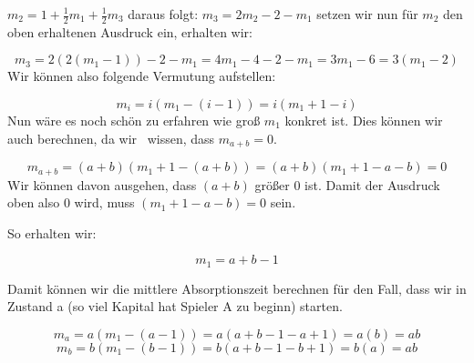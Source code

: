 \begin{uebsp}
 $m_{2}=1+\frac{1}{2}m_{1}+\frac{1}{2}m_{3}$  daraus folgt: 
$m_{3}=2m_{2}-2-m_{1}$ setzen wir nun f\"ur  $m_{2}$ den oben
erhaltenen Ausdruck ein, erhalten wir:




\bigskip

\begin{equation*}
m_{3}=2(2(m_{1}-1))-2-m_{1}=4m_{1}-4-2-m_{1}=3m_{1}-6=3(m_{1}-2)
\end{equation*}
Wir k\"onnen also folgende Vermutung aufstellen:





\begin{equation*}
m_{i}=i(m_{1}-(i-1))=i(m_{1}+1-i)
\end{equation*}
Nun w\"are es noch sch\"on zu erfahren wie gro{\ss}  $m_{1}$ konkret
ist. Dies k\"onnen wir auch berechnen, da wir \ wissen, dass
$m_{a+b}=0$.





\begin{equation*}
m_{a+b}=(a+b)(m_{1}+1-(a+b))=(a+b)(m_{1}+1-a-b)=0
\end{equation*}
Wir k\"onnen davon ausgehen, dass  $(a+b)$ gr\"o{\ss}er 0 ist. Damit der
Ausdruck oben also 0 wird, muss  $(m_{1}+1-a-b)=0$ sein.



So erhalten wir: 



\begin{equation*}
m_{1}=a+b-1
\end{equation*}

\bigskip

Damit k\"onnen wir die mittlere Absorptionszeit berechnen f\"ur den
Fall, dass wir in Zustand a (so viel Kapital hat Spieler A zu beginn)
starten.


\bigskip

\begin{equation*}
m_{a}=a(m_{1}-(a-1))=a(a+b-1-a+1)=a(b)=\mathit{ab}
\end{equation*}
\begin{equation*}
m_{b}=b(m_{1}-(b-1))=b(a+b-1-b+1)=b(a)=\mathit{ab}
\end{equation*}


%
\end{uebsp}
